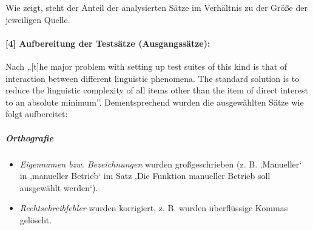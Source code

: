 Wie  zeigt, steht der Anteil der analysierten Sätze im Verhältnis zu der Größe der jeweiligen Quelle.

\paragraph*{[4] Aufbereitung der Testsätze (Ausgangssätze):}
Nach \citet{KingFalkedal1990} „[t]he major problem with setting up test suites of this kind is that of interaction between different linguistic phenomena. The standard solution is to reduce the linguistic complexity of all items other than the item of direct interest to an absolute minimum”. Dementsprechend wurden die ausgewählten Sätze wie folgt aufbereitet:

\subparagraph*{Orthografie}

\begin{itemize}
\item \textit{Eigennamen bzw. Bezeichnungen} wurden großgeschrieben (z. B. ‚Manueller‘ in ‚manueller Betrieb‘ im Satz ‚Die Funktion manueller Betrieb soll ausgewählt werden‘).
\item \textit{Rechtschreibfehler} wurden korrigiert, z. B. wurden überflüssige Kommas gelöscht.
\end{itemize}

